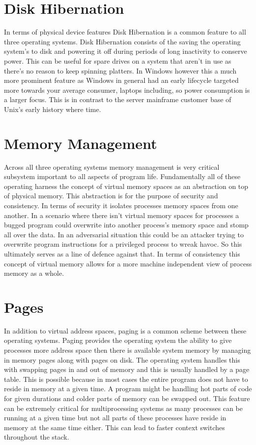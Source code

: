 \documentclass[letterpaper,10pt,draftclsnofoot,onecolumn]{IEEEtran}
\begin{document}
\section{Disk Hibernation}
In terms of physical device features Disk Hibernation is a common feature to all three operating systems. Disk Hibernation consists of the saving the operating system’s to disk and powering it off during periods of long inactivity to conserve power. This can be useful for spare drives on a system that aren’t in use as there’s no reason to keep spinning platters. In Windows however this a much more prominent feature as Windows in general had an early lifecycle targeted more towards your average consumer, laptops including, so power consumption is a larger focus. This is in contrast to the server mainframe customer base of Unix’s early history where time.\\

\newpage
\section{Memory Management}
Across all three operating systems memory management is very critical subsystem important to all aspects of program life. Fundamentally all of these operating harness the concept of virtual memory spaces as an abstraction on top of physical memory. This abstraction is for the purpose of security and consistency. In terms of security it isolates processes memory spaces from one another. In a scenario where there isn’t virtual memory spaces for processes a bugged program could overwrite into another process's memory space and stomp all over the data. In an adversarial situation this could be an attacker trying to overwrite program instructions for a privileged process to wreak havoc. So this ultimately serves as a line of defence against that. In terms of consistency this concept of virtual memory allows for a more machine independent view of process memory as a whole.\\

\section{Pages}
In addition to virtual address spaces, paging is a common scheme between these operating systems. Paging provides the operating system the ability to give processes more address space then there is available system memory by managing in memory pages along with pages on disk. The operating system handles this with swapping pages in and out of memory and this is usually handled by a page table. This is possible because in most cases the entire program does not have to reside in memory at a given time. A program might be handling hot parts of code for given durations and colder parts of memory can be swapped out. This feature can be extremely critical for multiprocessing systems as many processes can be running at a given time but not all parts of these processes have reside in memory at the same time either. This can lead to faster context switches throughout the stack.\\
\end{document}
